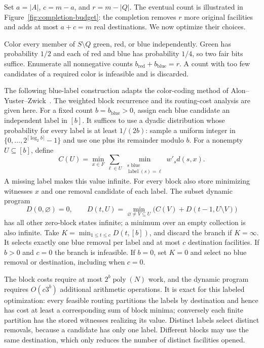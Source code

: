 Set $a=|A|$, $c=m-a$, and $r=m-|Q|$.
The eventual count is illustrated in Figure~\ref{fig:completion-budget}:
the completion removes $r$ more original facilities and adds at most
$a+c=m$ real destinations.  We now optimize their choices.

Color every member of
$S\setminus Q$ green, red, or blue independently.  Green has probability
$1/2$ and each of red and blue has probability $1/4$, so two fair bits
suffice.  Enumerate all nonnegative counts
$b_{\mathrm{red}}+b_{\mathrm{blue}}=r$.  A count with too few candidates
of a required color is infeasible and is discarded.

The following blue-label construction adapts the color-coding method
of Alon--Yuster--Zwick~\cite[Section~3, Lemma~3.1]{AlonYusterZwick1995}.
The weighted block recurrence and its routing-cost analysis are given here.
For a fixed count $b=b_{\mathrm{blue}}>0$, assign each blue candidate an
independent label in $[b]$.  It suffices to use a dyadic distribution
whose probability for every label is at least $1/(2b)$: sample a uniform
integer in $\{0,\ldots,2^{\lceil\log_2 b\rceil}-1\}$ and use one plus
its remainder modulo $b$.  For a nonempty $U\subseteq[b]$, define
\begin{equation}
 C(U)=\min_{x\in F}\sum_{\ell\in U}
       \min_{\substack{s\text{ blue}\\\operatorname{label}(s)=\ell}}
              w'_s d(s,x).
 \label{comp:blue-block}
\end{equation}
A missing label makes this value infinite.  For every block also store
minimizing witnesses $x$ and one removal candidate of each label.
The subset dynamic program
\[
 D(0,\varnothing)=0,\qquad
 D(t,U)=\min_{\varnothing\ne V\subseteq U}
             \bigl(C(V)+D(t-1,U\setminus V)\bigr)
\]
has all other zero-block states infinite; a minimum over an empty
collection is also infinite.  Take
$K=\min_{1\le t\le c}D(t,[b])$, and discard the branch if $K=\infty$.
It selects exactly one blue removal per label and at most $c$ destination
facilities.  If $b>0$ and $c=0$ the branch is infeasible.  If $b=0$, set
$K=0$ and select no blue removal or destination, including when $c=0$.

The block costs require at most $2^b\operatorname{poly}(N)$ work, and
the dynamic program requires $O(c3^b)$ additional arithmetic operations.
It is exact for this labeled optimization: every feasible routing
partitions the labels by destination and hence has cost at least a
corresponding sum of block minima; conversely each finite partition has
the stored witnesses realizing its value.  Distinct labels select
distinct removals, because a candidate has only one label.  Different
blocks may use the same destination, which only reduces the number of
distinct facilities opened.

